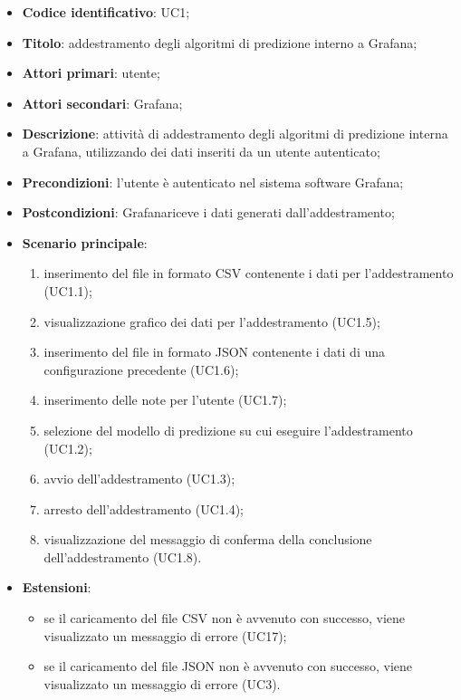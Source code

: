 \begin{itemize}
	\item \textbf{Codice identificativo}: UC1;
	\item \textbf{Titolo}: addestramento degli algoritmi di predizione interno a Grafana\glo;
	\item \textbf{Attori primari}: utente;
	\item \textbf{Attori secondari}: Grafana\glo;
	\item \textbf{Descrizione}: attività di addestramento degli algoritmi di predizione interna a Grafana\glo, utilizzando dei dati inseriti da un utente autenticato;
	\item \textbf{Precondizioni}: l'utente è autenticato nel sistema software Grafana\glo;
	\item \textbf{Postcondizioni}: Grafana\glosp riceve i dati generati dall'addestramento;
	\item \textbf{Scenario principale}: 
		\begin{enumerate}
			\item inserimento del file in formato CSV contenente i dati per l'addestramento (UC1.1);
			\item visualizzazione grafico dei dati per l'addestramento (UC1.5);
			\item inserimento del file in formato JSON contenente i dati di una configurazione precedente (UC1.6);
			\item inserimento delle note per l'utente (UC1.7);
			\item selezione del modello di predizione su cui eseguire l'addestramento (UC1.2);
			\item avvio dell'addestramento (UC1.3);
			\item arresto dell'addestramento (UC1.4);
			\item visualizzazione del messaggio di conferma della conclusione dell'addestramento (UC1.8).
		\end{enumerate}
	\item \textbf{Estensioni}:
	\begin{itemize}
		\item se il caricamento del file CSV non è avvenuto con successo, viene visualizzato un messaggio di errore (UC17);
		\item se il caricamento del file JSON non è avvenuto con successo, viene visualizzato un messaggio di errore (UC3).
	\end{itemize}
\end{itemize}


